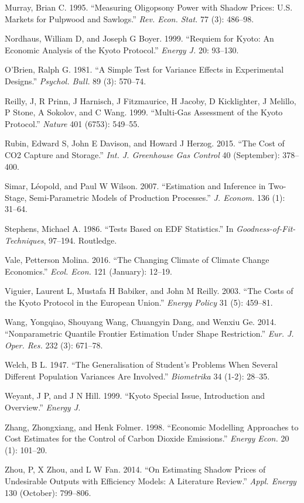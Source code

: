 \documentclass[
  12pt,
]{article}
\begin{document}
\leavevmode\hypertarget{ref-Murray1995}{}%
Murray, Brian C. 1995. ``Measuring Oligopsony Power with Shadow Prices: U.S. Markets for Pulpwood and Sawlogs.'' \emph{Rev. Econ. Stat.} 77 (3): 486--98.

\leavevmode\hypertarget{ref-Nordhaus1999}{}%
Nordhaus, William D, and Joseph G Boyer. 1999. ``Requiem for Kyoto: An Economic Analysis of the Kyoto Protocol.'' \emph{Energy J.} 20: 93--130.

\leavevmode\hypertarget{ref-OBrien1981}{}%
O'Brien, Ralph G. 1981. ``A Simple Test for Variance Effects in Experimental Designs.'' \emph{Psychol. Bull.} 89 (3): 570--74.

\leavevmode\hypertarget{ref-Reilly1999}{}%
Reilly, J, R Prinn, J Harnisch, J Fitzmaurice, H Jacoby, D Kicklighter, J Melillo, P Stone, A Sokolov, and C Wang. 1999. ``Multi-Gas Assessment of the Kyoto Protocol.'' \emph{Nature} 401 (6753): 549--55.

\leavevmode\hypertarget{ref-Rubin2015}{}%
Rubin, Edward S, John E Davison, and Howard J Herzog. 2015. ``The Cost of CO2 Capture and Storage.'' \emph{Int. J. Greenhouse Gas Control} 40 (September): 378--400.

\leavevmode\hypertarget{ref-Simar2007}{}%
Simar, Léopold, and Paul W Wilson. 2007. ``Estimation and Inference in Two-Stage, Semi-Parametric Models of Production Processes.'' \emph{J. Econom.} 136 (1): 31--64.

\leavevmode\hypertarget{ref-Stephens1986}{}%
Stephens, Michael A. 1986. ``Tests Based on EDF Statistics.'' In \emph{Goodness-of-Fit-Techniques}, 97--194. Routledge.

\leavevmode\hypertarget{ref-Vale2016}{}%
Vale, Petterson Molina. 2016. ``The Changing Climate of Climate Change Economics.'' \emph{Ecol. Econ.} 121 (January): 12--19.

\leavevmode\hypertarget{ref-Viguier2003}{}%
Viguier, Laurent L, Mustafa H Babiker, and John M Reilly. 2003. ``The Costs of the Kyoto Protocol in the European Union.'' \emph{Energy Policy} 31 (5): 459--81.

\leavevmode\hypertarget{ref-Wang2014}{}%
Wang, Yongqiao, Shouyang Wang, Chuangyin Dang, and Wenxiu Ge. 2014. ``Nonparametric Quantile Frontier Estimation Under Shape Restriction.'' \emph{Eur. J. Oper. Res.} 232 (3): 671--78.

\leavevmode\hypertarget{ref-Welch1947}{}%
Welch, B L. 1947. ``The Generalisation of Student's Problems When Several Different Population Variances Are Involved.'' \emph{Biometrika} 34 (1-2): 28--35.

\leavevmode\hypertarget{ref-Weyant1999}{}%
Weyant, J P, and J N Hill. 1999. ``Kyoto Special Issue, Introduction and Overview.'' \emph{Energy J.}

\leavevmode\hypertarget{ref-Zhang1998}{}%
Zhang, Zhongxiang, and Henk Folmer. 1998. ``Economic Modelling Approaches to Cost Estimates for the Control of Carbon Dioxide Emissions.'' \emph{Energy Econ.} 20 (1): 101--20.

\leavevmode\hypertarget{ref-Zhou2014}{}%
Zhou, P, X Zhou, and L W Fan. 2014. ``On Estimating Shadow Prices of Undesirable Outputs with Efficiency Models: A Literature Review.'' \emph{Appl. Energy} 130 (October): 799--806.
\end{document}
